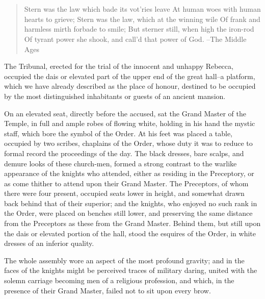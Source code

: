 \chapter{}

\begin{quote}
Stern was the law which bade its vot'ries leave
At human woes with human hearts to grieve;
Stern was the law, which at the winning wile
Of frank and harmless mirth forbade to smile;
But sterner still, when high the iron-rod
Of tyrant power she shook, and call'd that power of God.
--The Middle Ages
\end{quote}

The Tribunal, erected for the trial of the innocent and unhappy Rebecca,
occupied the dais or elevated part of the upper end of the great hall--a
platform, which we have already described as the place of honour,
destined to be occupied by the most distinguished inhabitants or guests
of an ancient mansion.

On an elevated seat, directly before the accused, sat the Grand Master
of the Temple, in full and ample robes of flowing white, holding in his
hand the mystic staff, which bore the symbol of the Order. At his feet
was placed a table, occupied by two scribes, chaplains of the Order,
whose duty it was to reduce to formal record the proceedings of the day.
The black dresses, bare scalps, and demure looks of these church-men,
formed a strong contrast to the warlike appearance of the knights who
attended, either as residing in the Preceptory, or as come thither to
attend upon their Grand Master. The Preceptors, of whom there were four
present, occupied seats lower in height, and somewhat drawn back behind
that of their superior; and the knights, who enjoyed no such rank in the
Order, were placed on benches still lower, and preserving the same
distance from the Preceptors as these from the Grand Master. Behind
them, but still upon the dais or elevated portion of the hall, stood the
esquires of the Order, in white dresses of an inferior quality.

The whole assembly wore an aspect of the most profound gravity; and in
the faces of the knights might be perceived traces of military daring,
united with the solemn carriage becoming men of a religious profession,
and which, in the presence of their Grand Master, failed not to sit upon
every brow.

